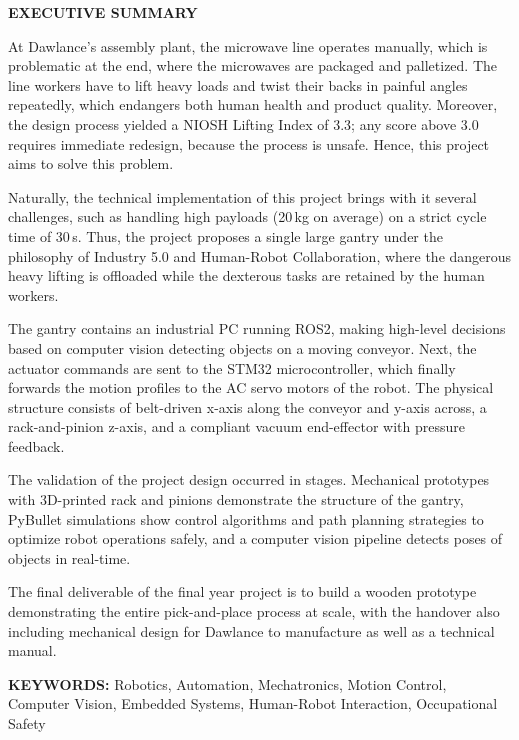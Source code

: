 \clearpage
\begin{centering}
\textbf{EXECUTIVE SUMMARY}\\
\vspace{\baselineskip}
\end{centering}

At Dawlance's assembly plant, the microwave line operates manually, which is problematic at the end, where the microwaves are packaged and palletized. The line workers have to lift heavy loads and twist their backs in painful angles repeatedly, which endangers both human health and product quality. Moreover, the design process yielded a NIOSH Lifting Index of 3.3; any score above 3.0 requires immediate redesign, because the process is unsafe. Hence, this project aims to solve this problem.

Naturally, the technical implementation of this project brings with it several challenges, such as handling high payloads (20\,kg on average) on a strict cycle time of 30\,s. Thus, the project proposes a single large gantry under the philosophy of Industry 5.0 and Human-Robot Collaboration, where the dangerous heavy lifting is offloaded while the dexterous tasks are retained by the human workers. 

The gantry contains an industrial PC running ROS2, making high-level decisions based on computer vision detecting objects on a moving conveyor. Next, the actuator commands are sent to the STM32 microcontroller, which finally forwards the motion profiles to the AC servo motors of the robot. The physical structure consists of belt-driven x-axis along the conveyor and y-axis across, a rack-and-pinion z-axis, and a compliant vacuum end-effector with pressure feedback.

The validation of the project design occurred in stages. Mechanical prototypes with 3D-printed rack and pinions demonstrate the structure of the gantry, PyBullet simulations show control algorithms and path planning strategies to optimize robot operations safely, and a computer vision pipeline detects poses of objects in real-time. 

The final deliverable of the final year project is to build a wooden prototype demonstrating the entire pick-and-place process at scale, with the handover also including mechanical design for Dawlance to manufacture as well as a technical manual. 
\\

\begin{flushleft}
\textbf{KEYWORDS:} Robotics, Automation, Mechatronics, Motion Control, Computer Vision, Embedded Systems, Human-Robot Interaction, Occupational Safety
\end{flushleft}


